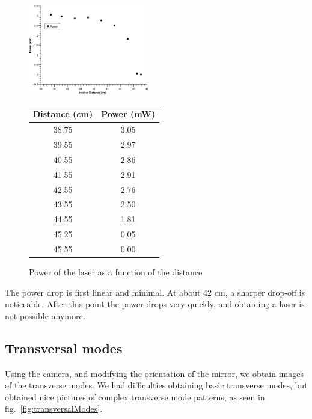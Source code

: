 \documentclass{scrartcl}
\begin{document}
\begin{figure}[!ht]
\centering
\parbox{0.4\textwidth}{
\begin{footnotesize}
    \includegraphics[width=0.47\textwidth]{distance.eps}
\end{footnotesize}}
\qquad
\begin{minipage}[c]{0.53\textwidth}%
\centering
    \begin{tabular}{c|c}
        Distance (cm) & Power (mW) \\
        \hline
        38.75 & 3.05 \\
        39.55 & 2.97 \\
        40.55 & 2.86  \\
        41.55 & 2.91 \\
        42.55 & 2.76 \\
        43.55 & 2.50 \\
        44.55 & 1.81 \\
        45.25 & 0.05 \\
        45.55 & 0.00
    \end{tabular}
\end{minipage}
\caption{Power of the laser as a function of the distance}
\end{figure}
\FloatBarrier

The power drop is first linear and minimal. At about 42 cm, a sharper drop-off is noticeable. After this point the power drops very quickly, and obtaining a laser is not possible anymore.

\subsection{Transversal modes}
Using the camera, and modifying the orientation of the mirror, we obtain images of the transverse modes. We had difficulties obtaining basic transverse modes, but obtained nice pictures of complex transverse mode patterns, as seen in fig.~\ref{fig:transversalModes}.
\end{document}
